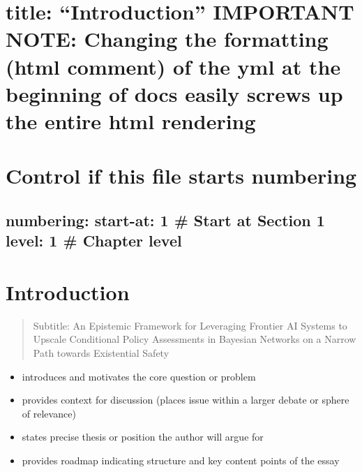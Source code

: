 \documentclass[
  11pt,
  letterpaper,
]{book}
\providecommand{\tightlist}{%
  \setlength{\itemsep}{0pt}\setlength{\parskip}{0pt}}
\begin{document}
\chapter{title: ``Introduction'' IMPORTANT NOTE: Changing the formatting
(html comment) of the yml at the beginning of docs easily screws up the
entire html
rendering}\label{title-introduction-important-note-changing-the-formatting-html-comment-of-the-yml-at-the-beginning-of-docs-easily-screws-up-the-entire-html-rendering}


\chapter{Control if this file starts
numbering}\label{control-if-this-file-starts-numbering-1}

\section{numbering: start-at: 1 \# Start at Section 1 level: 1 \#
Chapter
level}\label{numbering-start-at-1-start-at-section-1-level-1-chapter-level}


\chapter{Introduction}\label{sec-introduction}

\begin{quote}
Subtitle: An Epistemic Framework for Leveraging Frontier AI Systems to
Upscale Conditional Policy Assessments in Bayesian Networks on a Narrow
Path towards Existential Safety
\end{quote}

\begin{tcolorbox}[enhanced jigsaw, coltitle=black, opacitybacktitle=0.6, titlerule=0mm, colframe=quarto-callout-note-color-frame, breakable, leftrule=.75mm, colback=white, left=2mm, opacityback=0, colbacktitle=quarto-callout-note-color!10!white, bottomtitle=1mm, toptitle=1mm, title=\textcolor{quarto-callout-note-color}{\faInfo}\hspace{0.5em}{10\% of Grade: \textasciitilde{} 14\% of text \textasciitilde{} 4200
words \textasciitilde{} 10 pages}, arc=.35mm, bottomrule=.15mm, rightrule=.15mm, toprule=.15mm]

\begin{itemize}
\tightlist
\item
  introduces and motivates the core question or problem
\item
  provides context for discussion (places issue within a larger debate
  or sphere of relevance)
\item
  states precise thesis or position the author will argue for
\item
  provides roadmap indicating structure and key content points of the
  essay
\end{itemize}

\end{tcolorbox}
\end{document}
